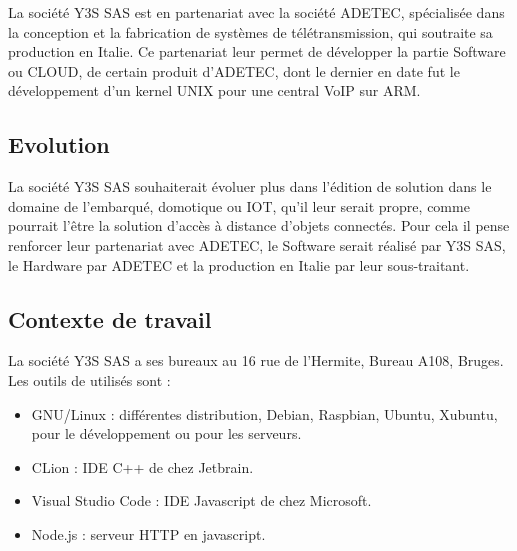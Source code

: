 La société Y3S SAS est en partenariat avec la société ADETEC, spécialisée dans la conception et la fabrication de systèmes de télétransmission, qui soutraite sa production en Italie. Ce partenariat leur permet de développer la partie \og Software \fg{} ou CLOUD, de certain produit d'ADETEC, dont le dernier en date fut le développement d'un kernel UNIX pour une central VoIP sur ARM.

\subsection{Evolution}

La société Y3S SAS souhaiterait évoluer plus dans l'édition de solution dans le domaine de l'embarqué, domotique ou IOT, qu'il leur serait propre, comme pourrait l'être la solution d'accès à distance d'objets connectés. Pour cela il pense renforcer leur partenariat avec ADETEC, le \og Software \fg{} serait réalisé par Y3S SAS, le \og Hardware \fg{} par ADETEC et la production en Italie par leur sous-traitant.

\subsection{Contexte de travail}

La société Y3S SAS a ses bureaux au 16 rue de l'Hermite, Bureau A108, Bruges. Les outils de utilisés sont :
\begin{itemize}
    \item GNU/Linux : différentes distribution, Debian, Raspbian, Ubuntu, Xubuntu, pour le développement ou pour les serveurs.
    \item CLion : IDE C++ de chez Jetbrain.
    \item Visual Studio Code : IDE Javascript de chez Microsoft.
    \item Node.js : serveur HTTP en javascript.
\end{itemize}

